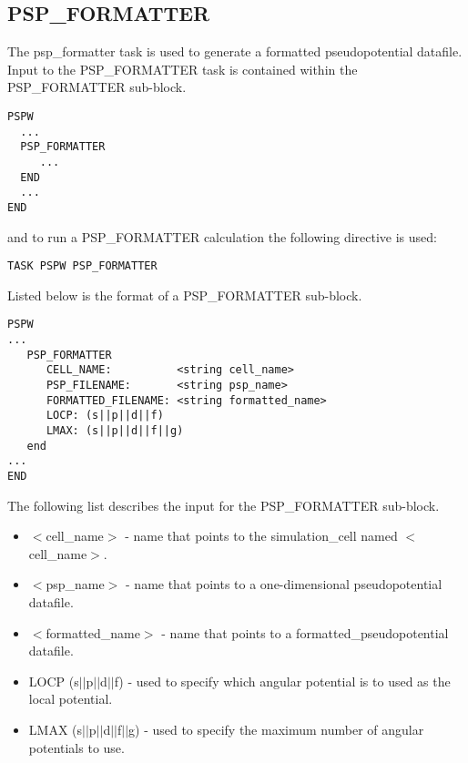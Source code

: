 \subsection{PSP\_FORMATTER}
The psp\_formatter task is used to generate a formatted pseudopotential 
datafile.
Input to the PSP\_FORMATTER task is contained
within the PSP\_FORMATTER sub-block.
\begin{verbatim}
PSPW
  ...
  PSP_FORMATTER
     ...
  END
  ...
END
\end{verbatim}
and to run a PSP\_FORMATTER calculation the following directive is used:
\begin{verbatim}
TASK PSPW PSP_FORMATTER
\end{verbatim}
Listed below is the format of a PSP\_FORMATTER sub-block.
\begin{verbatim}
PSPW
... 
   PSP_FORMATTER
      CELL_NAME:          <string cell_name> 
      PSP_FILENAME:       <string psp_name>
      FORMATTED_FILENAME: <string formatted_name>
      LOCP: (s||p||d||f)
      LMAX: (s||p||d||f||g)
   end
...
END
\end{verbatim}
The following list describes the input for the PSP\_FORMATTER
sub-block.
\begin{itemize}
	\item $<$cell\_name$>$ - name that points 
		to the simulation\_cell named $<$cell\_name$>$.
	\item $<$psp\_name$>$ - name that points
              to a one-dimensional pseudopotential datafile.
	\item $<$formatted\_name$>$ -  
 	      name that points to a formatted\_pseudopotential datafile.
  	\item LOCP (s$||$p$||$d$||$f) - used to specify which angular potential
	      is to used as the local potential.
        \item LMAX (s$||$p$||$d$||$f$||$g) - used to specify the maximum number
              of angular potentials to use.
\end{itemize}


